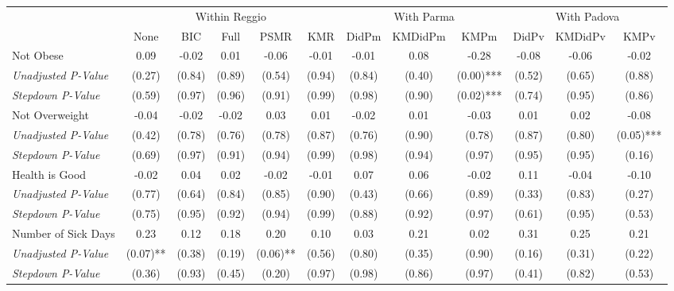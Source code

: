 \begin{tabular}{l c c c c c c c c c c c}
\toprule
& \multicolumn{5}{c}{Within Reggio} & \multicolumn{3}{c}{With Parma} & \multicolumn{3}{c}{With Padova} \\\cmidrule(lr){2-6} \cmidrule(lr){7-9} \cmidrule(lr){10-12}
 & None & BIC & Full & PSMR & KMR & DidPm & KMDidPm & KMPm & DidPv & KMDidPv & KMPv \\
\midrule
Not Obese & 0.09 & -0.02 & 0.01 & -0.06 & -0.01 & -0.01 & 0.08 & -0.28 & -0.08 & -0.06 & -0.02 \\
\quad \textit{Unadjusted P-Value} & (0.27) & (0.84) & (0.89) & (0.54) & (0.94) & (0.84) & (0.40) & (0.00)*** & (0.52) & (0.65) & (0.88) \\
\quad \textit{Stepdown P-Value} & (0.59) & (0.97) & (0.96) & (0.91) & (0.99) & (0.98) & (0.90) & (0.02)*** & (0.74) & (0.95) & (0.86) \\
Not Overweight & -0.04 & -0.02 & -0.02 & 0.03 & 0.01 & -0.02 & 0.01 & -0.03 & 0.01 & 0.02 & -0.08 \\
\quad \textit{Unadjusted P-Value} & (0.42) & (0.78) & (0.76) & (0.78) & (0.87) & (0.76) & (0.90) & (0.78) & (0.87) & (0.80) & (0.05)*** \\
\quad \textit{Stepdown P-Value} & (0.69) & (0.97) & (0.91) & (0.94) & (0.99) & (0.98) & (0.94) & (0.97) & (0.95) & (0.95) & (0.16) \\
Health is Good & -0.02 & 0.04 & 0.02 & -0.02 & -0.01 & 0.07 & 0.06 & -0.02 & 0.11 & -0.04 & -0.10 \\
\quad \textit{Unadjusted P-Value} & (0.77) & (0.64) & (0.84) & (0.85) & (0.90) & (0.43) & (0.66) & (0.89) & (0.33) & (0.83) & (0.27) \\
\quad \textit{Stepdown P-Value} & (0.75) & (0.95) & (0.92) & (0.94) & (0.99) & (0.88) & (0.92) & (0.97) & (0.61) & (0.95) & (0.53) \\
Number of Sick Days & 0.23 & 0.12 & 0.18 & 0.20 & 0.10 & 0.03 & 0.21 & 0.02 & 0.31 & 0.25 & 0.21 \\
\quad \textit{Unadjusted P-Value} & (0.07)** & (0.38) & (0.19) & (0.06)** & (0.56) & (0.80) & (0.35) & (0.90) & (0.16) & (0.31) & (0.22) \\
\quad \textit{Stepdown P-Value} & (0.36) & (0.93) & (0.45) & (0.20) & (0.97) & (0.98) & (0.86) & (0.97) & (0.41) & (0.82) & (0.53) \\
\bottomrule
\end{tabular}
